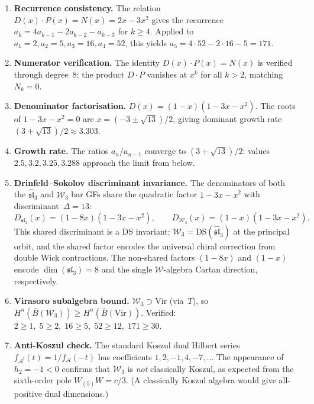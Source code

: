 \begin{enumerate}
\item \textbf{Recurrence consistency.}
 The relation $D(x) \cdot P(x) = N(x) = 2x - 3x^2$ gives
 the recurrence $a_k = 4a_{k-1} - 2a_{k-2} - a_{k-3}$
 for $k \ge 4$. Applied to
 $a_1 = 2, a_2 = 5, a_3 = 16, a_4 = 52$,
 this yields $a_5 = 4 \cdot 52 - 2 \cdot 16 - 5 = 171$.

\item \textbf{Numerator verification.}
 The identity $D(x) \cdot P(x) = N(x)$ is verified through
 degree~$8$: the product $D \cdot P$ vanishes at $x^k$ for
 all $k > 2$, matching $N_k = 0$.

\item \textbf{Denominator factorisation.}
 $D(x) = (1-x)(1-3x-x^2)$. The roots of $1-3x-x^2 = 0$
 are $x = (-3 \pm \sqrt{13})/2$, giving dominant growth rate
 $(3 + \sqrt{13})/2 \approx 3.303$.

\item \textbf{Growth rate.}
 The ratios $a_n / a_{n-1}$ converge to
 $(3 + \sqrt{13})/2$: values $2.5, 3.2, 3.25, 3.288$
 approach the limit from below.

\item \textbf{Drinfeld--Sokolov discriminant invariance.}
 The denominators of both the $\widehat{\mathfrak{sl}}_3$ and
 $\mathcal{W}_3$ bar GFs share the quadratic factor
 $1-3x-x^2$ with discriminant~$\Delta = 13$:
 \[
 D_{\mathfrak{sl}_3}(x) = (1-8x)(1-3x-x^2), \qquad
 D_{\mathcal{W}_3}(x) = (1-x)(1-3x-x^2).
 \]
 This shared discriminant is a DS invariant:
 $\mathcal{W}_3 = \mathrm{DS}(\widehat{\mathfrak{sl}}_3)$
 at the principal orbit, and the shared factor encodes
 the universal chiral correction from double Wick
 contractions. The non-shared factors
 $(1-8x)$ and $(1-x)$ encode $\dim(\mathfrak{sl}_3) = 8$
 and the single $\mathcal{W}$-algebra Cartan direction,
 respectively.

\item \textbf{Virasoro subalgebra bound.}
 $\mathcal{W}_3 \supset \mathrm{Vir}$ (via~$T$), so
 $H^n(\bar{B}(\mathcal{W}_3)) \ge H^n(\bar{B}(\mathrm{Vir}))$.
 Verified: $2 \ge 1, \; 5 \ge 2, \; 16 \ge 5, \;
 52 \ge 12, \; 171 \ge 30$.

\item \textbf{Anti-Koszul check.}
 The standard Koszul dual Hilbert series
 $f_{\mathcal{A}^!}(t) = 1/f_{\mathcal{A}}(-t)$ has
 coefficients $1, 2, -1, 4, -7, \ldots$
 The appearance of $h_2 = -1 < 0$ confirms that
 $\mathcal{W}_3$ is \emph{not} classically Koszul,
 as expected from the sixth-order pole $W_{(5)}W = c/3$.
 (A classically Koszul algebra would give all-positive
 dual dimensions.)
\end{enumerate}


